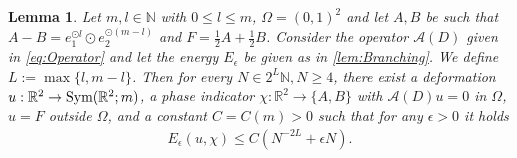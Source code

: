 \documentclass[a4paper, 10pt, twoside, notitlepage]{amsart}
\theoremstyle{plain}
\newtheorem{lem}[prop]{Lemma}
\newcommand{\R}{\mathbb{R}}
\newcommand{\N}{\mathbb{N}}
\newcommand{\A}{\mathcal{A}}
\begin{document}
		\begin{lem} \label{lem:Intermediate} Let $m,l \in \N$ with $0\leq l \leq m$, $\Omega = (0,1)^2$ and let $A,B$ be such that $A-B = e_1^{\odot l } \odot e_2^{\odot (m-l)}$ and $F=\frac{1}{2}A+\frac{1}{2}B$.  Consider the operator $\A(D)$ given in \cref{eq:Operator} and let the energy $E_{\epsilon}$ be given as in \cref{lem:Branching}.  We define $L := \max \{l,m-l\}$.  Then for every $N \in 2^L\N, N \geq 4$, there
			exist a deformation $u: \R^2 \to \textup{Sym}(\R^2;m)$, a phase indicator $\chi:\R^2 \to \{A,B\}$ with $\A(D)u = 0$ in $\Omega$, $u = F$ outside $\Omega$, and a constant
				$C = C(m)>0$ such that for any $\epsilon >0$ it holds
			\begin{align*}
				E_{\epsilon}(u,\chi) \leq C(N^{-2L} + \epsilon N).
			\end{align*}
		\end{lem}
		
\end{document}
